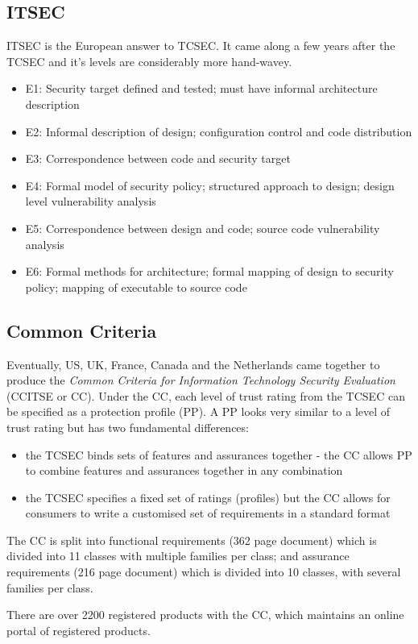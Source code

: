 \subsection{ITSEC}
ITSEC is the European answer to TCSEC. It came along a few years after the TCSEC and it's levels are considerably more hand-wavey. 
\begin{itemize}
    \item E1: Security target defined and tested; must have informal architecture description
    \item E2: Informal description of design; configuration control and code distribution
    \item E3: Correspondence between code and security target
    \item E4: Formal model of security policy; structured approach to design; design level vulnerability analysis
    \item E5: Correspondence between design and code; source code vulnerability analysis
    \item E6: Formal methods for architecture; formal mapping of design to security policy; mapping of executable to source code
\end{itemize}

\subsection{Common Criteria}
Eventually, US, UK, France, Canada and the Netherlands came together to produce the \textit{Common Criteria for Information Technology Security Evaluation} (CCITSE or CC). Under the CC, each level of trust rating from the TCSEC can be specified as a protection profile (PP). A PP looks very similar to a level of trust rating but has two fundamental differences:
\begin{itemize}
    \item the TCSEC binds sets of features and assurances together - the CC allows PP to combine features and assurances together in any combination
    \item the TCSEC specifies a fixed set of ratings (profiles) but the CC allows for consumers to write a customised set of requirements in a standard format
\end{itemize}

The CC is split into functional requirements (362 page document) which is divided into 11 classes with multiple families per class; and assurance requirements (216 page document) which is divided into 10 classes, with several families per class. 

There are over 2200 registered products with the CC, which maintains an online portal of registered products.
